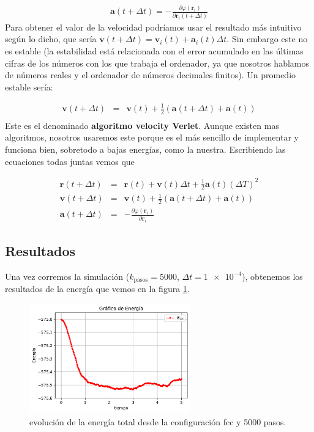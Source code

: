 \documentclass[11pt]{article} %
\newcommand{\parentesis}[1]{\left( #1  \right)}
\newcommand{\parciales}[2]{\frac{\partial #1}{\partial #2}}
\newcommand{\an}{\mathbf{a}}
\newcommand{\rn}{\mathbf{r}}
\newcommand{\vn}{\mathbf{v}}
\begin{document}
\begin{eqnarray}
	\an (t+\Delta t) = - \parciales{\varphi (\rn_i)}{\rn_{i}(t+\Delta t)}
\end{eqnarray}
Para obtener el valor de la velocidad podríamos usar el resultado más intuitivo según lo dicho, que sería $\vn(t+\Delta t) = \vn_i (t) + \an_i (t) \Delta t$. Sin embargo este no es estable (la estabilidad está relacionada con el error acumulado en las últimas cifras de los números con los que trabaja el ordenador, ya que nosotros hablamos de números reales y el ordenador de números decimales finitos). Un promedio estable sería:

\begin{eqnarray}
	\vn(t+\Delta t) & = & \vn(t) + \frac{1}{2} \parentesis{\an(t+\Delta t)+ \an(t)} \\
\end{eqnarray}
Este es el denominado \textbf{algoritmo velocity Verlet}. Aunque existen mas algoritmos, nosotros usaremos este porque es el más sencillo de implementar y funciona bien, sobretodo a bajas energías, como la nuestra. Escribiendo las ecuaciones todas juntas vemos que

\begin{eqnarray*}
	\rn(t+\Delta t) & = & \rn(t) + \vn(t) \Delta t + \frac{1}{2} \an (t) (\Delta T)^2 \\
	\vn(t+\Delta t) & = & \vn(t) + \frac{1}{2} \parentesis{\an(t+\Delta t)+ \an(t)} \\
	\an(t+\Delta t) & = &  - \parciales{\varphi(\rn_i)}{\rn_i}
\end{eqnarray*}


\subsection{Resultados}

Una vez corremos la simulación ($k_{\text{pasos}}=5000$, $\Delta t=\num{1e-4}$), obtenemos los resultados de la energía que vemos en la figura \ref{Fig:01}. 

\begin{figure}[h!] \centering
	\includegraphics[width=0.62\textwidth]{../../Graficas/Et-equilibra.pdf}
	\caption{evolución de la energía total desde la configuración fcc y 5000 pasos.}
	\label{Fig:01}
\end{figure}	
\end{document}
